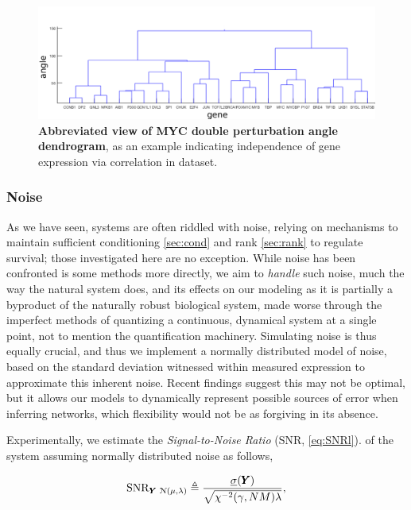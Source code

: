 \begin{figure}[H]
\centering
\includegraphics[width=1\linewidth]{4/MYC_Y_weightedDouble_dendrogram.png}
\caption{\textbf{Abbreviated view of MYC double perturbation angle dendrogram}, as an example indicating independence of gene expression via correlation in dataset.}
\label{fig:dend}
\end{figure}

\pagebreak

\subsubsection{Noise}
\label{sec:snr}
As we have seen, systems are often riddled with noise, relying on mechanisms to maintain sufficient conditioning \cref{sec:cond} and rank \cref{sec:rank} to regulate survival; those investigated here are no exception. While noise has been confronted is some methods more directly\citep{zhang2012narromi}, we aim to \emph{handle} such noise, much the way the natural system does, and its effects on our modeling as it is partially a byproduct of the naturally robust biological system, made worse through the imperfect methods of quantizing a continuous, dynamical system at a single point, not to mention the quantification machinery. Simulating noise is thus equally crucial, and thus we implement a normally distributed model of noise, based on the standard deviation witnessed within measured expression to approximate this inherent noise. Recent findings suggest this may not be optimal, but it allows our models to dynamically represent possible sources of error when inferring networks, which flexibility would not be as forgiving in its absence.

Experimentally, we estimate the \emph{Signal-to-Noise Ratio} (SNR, \cref{eq:SNRl}). of the system assuming normally distributed noise as follows,

\begin{equation}
	\operatorname{SNR}_{{\pmb{Y}}\, \operatorname{\mathcal{N}(\mu,\lambda)}} \triangleq \frac{\underline{\sigma}({\pmb{Y}})}{\sqrt{\chi^{-2}(\gamma,NM)\lambda}},
  \label{eq:SNRl}
\end{equation}

